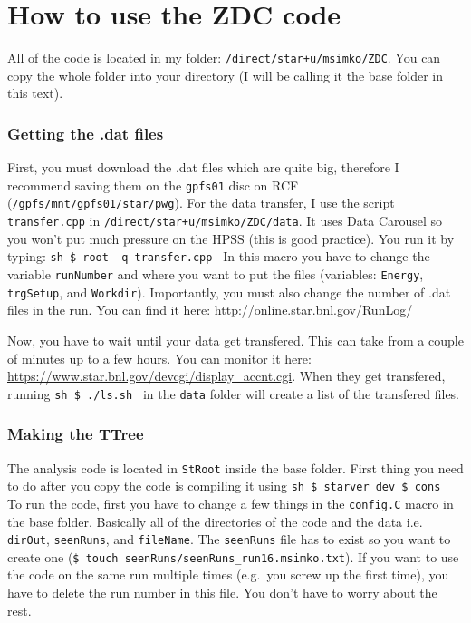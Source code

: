 \section{How to use the ZDC code}\hypertarget{how-to-use-the-zdc-code}{}\label{how-to-use-the-zdc-code}

All of the code is located in my folder: \texttt{/direct/star+u/msimko/ZDC}. You can copy the whole folder into
your directory (I will be calling it the base folder in this text).

\subsubsection{Getting the .dat files}\hypertarget{getting-the-dat-files}{}\label{getting-the-dat-files}

First, you must download the .dat files which are quite big, therefore I recommend saving them on
the \texttt{gpfs01} disc on RCF (\texttt{/gpfs/mnt/gpfs01/star/pwg}). For the data transfer, I use the script
\texttt{transfer.cpp} in \texttt{/direct/star+u/msimko/ZDC/data}. It uses Data Carousel so you won't put much
pressure on the HPSS (this is good practice). You run it by typing:
\texttt{sh
\$ root -q transfer.cpp
}
In this macro you have to change the variable
\texttt{runNumber} and where you want to put the files (variables: \texttt{Energy}, \texttt{trgSetup}, and \texttt{Workdir}).
Importantly, you must also change the number of .dat files in the run. You can find it here:
\href{http://online.star.bnl.gov/RunLog/}{http://online.star.bnl.gov/RunLog/}

Now, you have to wait until your data get transfered. This can take from a couple of minutes up to a few hours.
You can monitor it here:
\href{https://www.star.bnl.gov/devcgi/display\_accnt.cgi}{https://www.star.bnl.gov/devcgi/display\_accnt.cgi}. When they get transfered, running
\texttt{sh
\$ ./ls.sh
}
in the \texttt{data} folder will create a list of the transfered files.

\subsubsection{Making the TTree}\hypertarget{making-the-ttree}{}\label{making-the-ttree}

The analysis code is located in \texttt{StRoot} inside the base folder. First thing you need to do after you
copy the code is compiling it using
\texttt{sh
\$ starver dev
\$ cons
}
To run the code, first you have to change a few things in the \texttt{config.C} macro in the base folder. Basically all of the
directories of the code and the data i.e. \texttt{dirOut}, \texttt{seenRuns}, and \texttt{fileName}. The \texttt{seenRuns} file has to
exist so you want to create one (\texttt{\$ touch seenRuns/seenRuns\_run16.msimko.txt}). If you want to use the code
on the same run multiple times (e.g.\ you screw up the first time), you have to delete the run number in
this file. You don't have to worry
about the rest.

